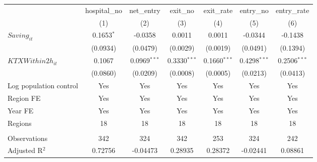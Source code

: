 \begingroup
\centering
\begin{tabular}{lcccccc}
   \toprule
                          & hospital\_no  & net\_entry     & exit\_no       & exit\_rate     & entry\_no      & entry\_rate \\    
                          & (1)           & (2)            & (3)            & (4)            & (5)            & (6)\\  
   \midrule 
   $Saving_{it}$          & 0.1653$^{*}$  & -0.0358        & 0.0011         & 0.0011         & -0.0344        & -0.1438\\   
                          & (0.0934)      & (0.0479)       & (0.0029)       & (0.0019)       & (0.0491)       & (0.1394)\\   
   $KTXWithin2h_{it}$     & 0.1067        & 0.0969$^{***}$ & 0.3330$^{***}$ & 0.1660$^{***}$ & 0.4298$^{***}$ & 0.2506$^{***}$\\   
                          & (0.0860)      & (0.0209)       & (0.0008)       & (0.0005)       & (0.0213)       & (0.0413)\\   
   Log population control & Yes           & Yes            & Yes            & Yes            & Yes            & Yes\\  
   Region FE              & Yes           & Yes            & Yes            & Yes            & Yes            & Yes\\  
   Year FE                & Yes           & Yes            & Yes            & Yes            & Yes            & Yes\\  
   Regions                & 18            & 18             & 18             & 18             & 18             & 18\\  
    \\
   Observations           & 342           & 324            & 342            & 253            & 324            & 242\\  
   Adjusted R$^2$         & 0.72756       & -0.04473       & 0.28935        & 0.28372        & -0.02441       & 0.08861\\  
   \bottomrule
\end{tabular}
\par\endgroup
